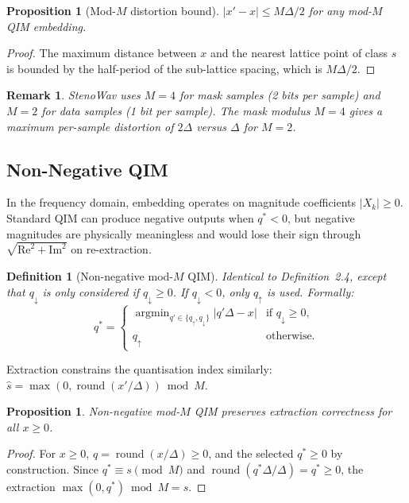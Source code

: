 \documentclass[11pt,a4paper]{article}
\newtheorem{proposition}[theorem]{Proposition}
\newtheorem{definition}[theorem]{Definition}
\newtheorem{remark}[theorem]{Remark}
\newcommand{\abs}[1]{\left| #1 \right|}
\DeclareMathOperator{\round}{round}
\DeclareMathOperator{\argmin}{argmin}
\begin{document}
\begin{proposition}[Mod-$M$ distortion bound]
$\abs{x' - x} \leq M\Delta / 2$ for any mod-$M$ QIM embedding.
\end{proposition}

\begin{proof}
The maximum distance between $x$ and the nearest lattice point of class $s$
is bounded by the half-period of the sub-lattice spacing, which is $M\Delta/2$.
\end{proof}

\begin{remark}
StenoWav uses $M = 4$ for mask samples (2 bits per sample) and $M = 2$
for data samples (1 bit per sample).  The mask modulus $M = 4$ gives a
maximum per-sample distortion of $2\Delta$ versus $\Delta$ for $M = 2$.
\end{remark}

\subsection{Non-Negative QIM}
\label{sec:nonneg-qim}

In the frequency domain, embedding operates on magnitude coefficients
$\abs{X_k} \geq 0$.  Standard QIM can produce negative outputs when
$q^* < 0$, but negative magnitudes are physically meaningless and
would lose their sign through $\sqrt{\mathrm{Re}^2 + \mathrm{Im}^2}$
on re-extraction.

\begin{definition}[Non-negative mod-$M$ QIM]
Identical to Definition~2.4, except that $q_{\downarrow}$ is only
considered if $q_{\downarrow} \geq 0$.  If $q_{\downarrow} < 0$,
only $q_{\uparrow}$ is used.  Formally:
\[
    q^* = \begin{cases}
        \displaystyle\argmin_{q' \in \{q_\uparrow, q_\downarrow\}} \abs{q'\Delta - x}
            & \text{if } q_\downarrow \geq 0, \\[6pt]
        q_\uparrow & \text{otherwise.}
    \end{cases}
\]
\end{definition}

Extraction constrains the quantisation index similarly:
$\hat{s} = \max(0, \round(x'/\Delta)) \bmod M$.

\begin{proposition}
Non-negative mod-$M$ QIM preserves extraction correctness for all $x \geq 0$.
\end{proposition}

\begin{proof}
For $x \geq 0$, $q = \round(x/\Delta) \geq 0$, and the selected $q^* \geq 0$
by construction.  Since $q^* \equiv s \pmod{M}$ and
$\round(q^*\Delta / \Delta) = q^* \geq 0$, the extraction
$\max(0, q^*) \bmod M = s$.
\end{proof}
\end{document}
